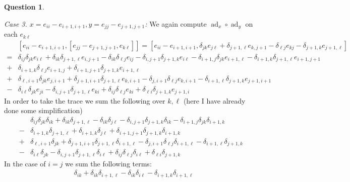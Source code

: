 \documentclass[10.5pt]{article}
\theoremstyle{definition}
\newtheorem{pb}{Question}
\numberwithin{example}{subsection}
\numberwithin{proposition}{subsection}
\begin{document}
\begin{pb}
\begin{enumerate}
            \emph{Case 3. \(x = e_{ii} - e_{i+1,i+1}, y = e_{jj} - e_{j+1,j+1}\):} We again compute \(\operatorname{ad}_x\circ \operatorname{ad}_y\) on each \(e_{k\ell}\)
            \begin{align}
                &[e_{ii} - e_{i+1,i+1},[e_{jj} - e_{j+1,j+1},e_{k\ell}]] = [e_{ii} - e_{i+1,i+1}, \delta_{jk}e_{j\ell} + \delta_{j+1,\ell}e_{k,j+1} - \delta_{\ell j}e_{kj} - \delta_{j+1,k}e_{j+1,\ell}] \\
                = &\delta_{ij}\delta_{jk}e_{i\ell} + \delta_{ik}\delta_{j+1,\ell}e_{i,j+1} - \delta_{ik}\delta_{\ell j}e_{ij} - \delta_{i,j+1}\delta_{j+1,k}e_{i\ell} - \delta_{i+1,j}\delta_{jk}e_{i+1,\ell} - \delta_{i+1,k}\delta_{j+1,\ell}e_{i+1,j+1} \\
                + & \delta_{i+1,k}\delta_{\ell j}e_{i+1,j} + \delta_{i+1,j+1}\delta_{j+1,k}e_{i+1,\ell}\\
                + &\delta_{\ell,i+1}\delta_{jk}e_{j,i+1} + \delta_{j+1,i+1}\delta_{j+1,\ell}e_{k,i+1} - \delta_{j,i+1}\delta_{\ell j}e_{k,i+1} - \delta_{i+1,\ell}\delta_{j+1,k}e_{j+1,i+1} \\
                - & \delta_{i\ell}\delta_{jk}e_{ji} - \delta_{i,j+1}\delta_{j+1,\ell}e_{ki} + \delta_{ij}\delta_{\ell j}e_{ki} + \delta_{\ell i}\delta_{j+1,k}e_{j+1,i}
            \end{align}
            In order to take the trace we sum the following over \(k,\ell\) (here I have already done some simplification)
            \begin{align}
                &\delta_{ij}\delta_{jk}\delta_{ik} + \delta_{ik}\delta_{j+1,\ell} - \delta_{ik}\delta_{j\ell} - \delta_{i,j+1}\delta_{j+1,k}\delta_{ik} - \delta_{i+1,j}\delta_{jk}\delta_{i+1,k}  \\
                - &\delta_{i+1,k}\delta_{j+1,\ell}
                + \delta_{i+1,k}\delta_{j\ell} + \delta_{i+1,j+1}\delta_{j+1,k}\delta_{i+1,k}\\
                + &\delta_{\ell,i+1}\delta_{jk} + \delta_{j+1,i+1}\delta_{j+1,\ell}\delta_{i+1,\ell} - \delta_{j,i+1}\delta_{\ell j}\delta_{i+1,\ell} - \delta_{i+1,\ell}\delta_{j+1,k} \\
                - & \delta_{i\ell}\delta_{jk} - \delta_{i,j+1}\delta_{j+1,\ell}\delta_{i\ell} + \delta_{ij}\delta_{\ell j}\delta_{i\ell} + \delta_{\ell i}\delta_{j+1,k}
            \end{align}
            In the case of \(i = j\) we sum the following terms:
            \begin{align}
                &\delta_{ik} + \delta_{ik}\delta_{i+1,\ell} - \delta_{ik}\delta_{i\ell} - \delta_{i+1,k}\delta_{i+1,\ell}

\end{align}
\end{enumerate}
\end{pb}
\end{document}
